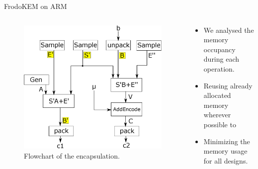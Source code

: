 \documentclass{beamer}            %
\begin{document}
\begin{frame}{FrodoKEM on ARM}

\begin{columns}
\hspace{.5cm}
	\begin{column}{0.45\textwidth}
		\begin{figure}
		\includegraphics[scale=0.33]{frodo_flowchart_encaps}
		\caption{Flowchart of the encapsulation.}
		\end{figure}
    \end{column}
    \begin{column}{0.55\textwidth}
    \hspace{-3.5cm}
		\begin{itemize}
		\item We analysed the memory occupancy during each operation.
		\item Reusing already allocated memory wherever possible to 
		\item Minimizing the memory usage for all designs.		
		
		\end{itemize}
    \end{column}
\end{columns}

\end{frame}

\end{document}
